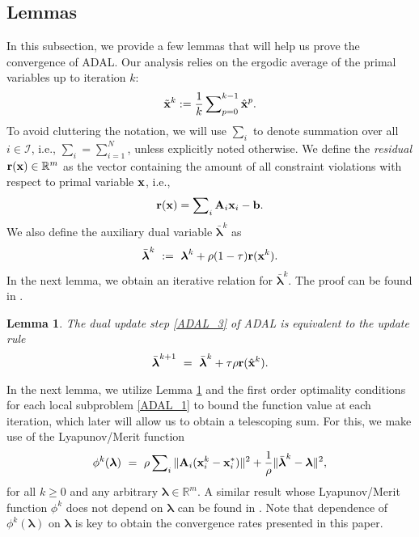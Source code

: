 \documentclass[doublecolumn]{IEEEtran}
\newtheorem{lem}{\bf \noindent Lemma}
\begin{document}
\subsection{Lemmas}
In this subsection, we provide a few lemmas that will help us prove the convergence of ADAL.
Our analysis relies on the ergodic average of the primal variables up to iteration $k$:
\begin{align*}
{ \tilde{\bf x} }^k := \frac{1}{k}\sum\nolimits_{p=0}^{k-1} {\hat{\mathbf x}}^p.
\end{align*}
To avoid cluttering the notation, we will use $\sum_i$ to denote summation over all $i\in\mathcal{I}$, i.e., $\sum_i = \sum_{i=1}^N$, unless explicitly noted otherwise.
We define the \emph{residual} ${ {\bf r} }({ {\bf x} }) \in\mathbb{R}^m$  as the vector containing the amount of all constraint violations with respect to primal variable ${ {\bf x} }$, i.e.,
\begin{align}\label{eqn:residual}
{ {\bf r} }({ {\bf x} }) = \sum\nolimits_i { {\bf A} }_i { {\bf x} }_i - { {\bf b} }.
\end{align}
We also define the auxiliary dual variable $\bar{\boldsymbol{\lambda}}^k$ as
\begin{align}\label{lambda_bar}
\bar{\boldsymbol{\lambda}}^k ~:=~ {\boldsymbol{\lambda}}^k  +\rho(1-\tau){ {\bf r} }({ {\bf x} }^k).
\end{align}
In the next lemma, we obtain an iterative relation for $\bar{\boldsymbol{\lambda}}^k$.
The proof can be found in \cite[Theorem 1]{Nikos_math_prog}.

\begin{lem}\label{lem:lbar}
The dual update step \eqref{ADAL_3} of ADAL is equivalent to the update rule
\begin{equation*}
\bar{\boldsymbol{\lambda}}^{k+1} ~=~ \bar{\boldsymbol{\lambda}}^{k}+\tau\rho { {\bf r} }(\hat{ {\bf x} }^k).
\end{equation*}
\end{lem}
\vspace{3pt}

In the next lemma, we utilize Lemma \ref{lem:lbar} and the first order optimality conditions for each local subproblem \eqref{ADAL_1} to
bound the function value at each iteration, which later will allow us to obtain a telescoping sum.
For this, we make use of the Lyapunov/Merit function
\begin{align}\label{phi}
\phi^k({\boldsymbol{\lambda}}) ~=~ \rho\sum\nolimits_{i}\| { {\bf A} }_i ({ {\bf x} }_i^k -{ {\bf x} }_i^*) \|^2 + \frac{1}{\rho}\|\bar{\boldsymbol{\lambda}}^k-{\boldsymbol{\lambda}} \|^2,
\end{align}
for all $k \ge 0$ and any arbitrary ${\boldsymbol{\lambda}} \in \mathbb{R}^m$.
A similar result whose Lyapunov/Merit function $\phi^k$ does not depend on ${\boldsymbol{\lambda}}$
can be found in \cite{Nikos_ACC2015}. Note that dependence of $\phi^k({\boldsymbol{\lambda}})$ on ${\boldsymbol{\lambda}}$ is key to obtain the convergence rates presented in this paper.
\end{document}

